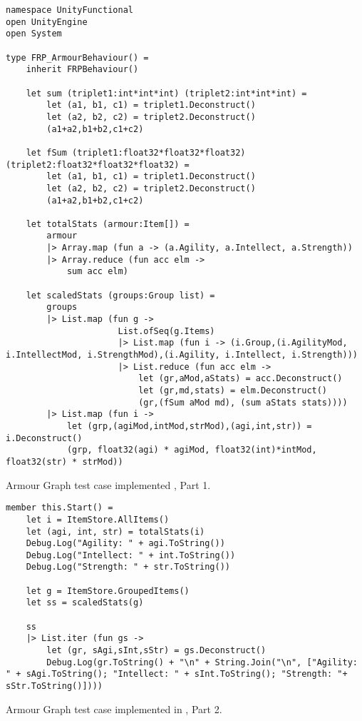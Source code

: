 \begin{listing}[H]
\begin{verbatim}
namespace UnityFunctional
open UnityEngine
open System

type FRP_ArmourBehaviour() =
    inherit FRPBehaviour()

    let sum (triplet1:int*int*int) (triplet2:int*int*int) =
        let (a1, b1, c1) = triplet1.Deconstruct()
        let (a2, b2, c2) = triplet2.Deconstruct()
        (a1+a2,b1+b2,c1+c2)

    let fSum (triplet1:float32*float32*float32) (triplet2:float32*float32*float32) =
        let (a1, b1, c1) = triplet1.Deconstruct()
        let (a2, b2, c2) = triplet2.Deconstruct()
        (a1+a2,b1+b2,c1+c2)

    let totalStats (armour:Item[]) =
        armour
        |> Array.map (fun a -> (a.Agility, a.Intellect, a.Strength))
        |> Array.reduce (fun acc elm ->
            sum acc elm)

    let scaledStats (groups:Group list) =
        groups
        |> List.map (fun g ->
                      List.ofSeq(g.Items)
                      |> List.map (fun i -> (i.Group,(i.AgilityMod, i.IntellectMod, i.StrengthMod),(i.Agility, i.Intellect, i.Strength)))
                      |> List.reduce (fun acc elm ->
                          let (gr,aMod,aStats) = acc.Deconstruct()
                          let (gr,md,stats) = elm.Deconstruct()
                          (gr,(fSum aMod md), (sum aStats stats))))
        |> List.map (fun i ->
            let (grp,(agiMod,intMod,strMod),(agi,int,str)) = i.Deconstruct()
            (grp, float32(agi) * agiMod, float32(int)*intMod, float32(str) * strMod))
\end{verbatim}
\caption{Armour Graph test case implemented \fs, Part 1.}
\label{lst:armour-graph-fs-1}
\end{listing}

\begin{listing}[H]
\begin{verbatim}
member this.Start() =
    let i = ItemStore.AllItems()
    let (agi, int, str) = totalStats(i)
    Debug.Log("Agility: " + agi.ToString())
    Debug.Log("Intellect: " + int.ToString())
    Debug.Log("Strength: " + str.ToString())

    let g = ItemStore.GroupedItems()
    let ss = scaledStats(g)

    ss
    |> List.iter (fun gs ->
        let (gr, sAgi,sInt,sStr) = gs.Deconstruct()
        Debug.Log(gr.ToString() + "\n" + String.Join("\n", ["Agility: " + sAgi.ToString(); "Intellect: " + sInt.ToString(); "Strength: "+ sStr.ToString()])))
\end{verbatim}
\caption{Armour Graph test case implemented in \fs, Part 2.}
\label{lst:armour-graph-fs-2}
\end{listing}

